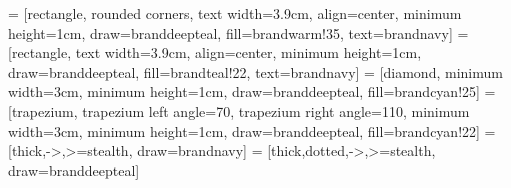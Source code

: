 \usepackage[english]{babel}
\usepackage{libertinus}
\usepackage[scaled=0.86]{beramono}
\usepackage{float}%
\usepackage{hyperref}
\usepackage{tikz}
\usepackage{xcolor}
 = [rectangle, rounded corners, text width=3.9cm, align=center, minimum height=1cm, draw=branddeepteal, fill=brandwarm!35, text=brandnavy]
 = [rectangle, text width=3.9cm, align=center, minimum height=1cm, draw=branddeepteal, fill=brandteal!22, text=brandnavy]
 = [diamond, minimum width=3cm, minimum height=1cm, draw=branddeepteal, fill=brandcyan!25]
 = [trapezium, trapezium left angle=70, trapezium right angle=110, minimum width=3cm, minimum height=1cm, draw=branddeepteal, fill=brandcyan!22]
 = [thick,->,>=stealth, draw=brandnavy]
 = [thick,dotted,->,>=stealth, draw=branddeepteal]
\usetikzlibrary{automata, positioning, arrows}
\usepackage{xurl}%
\usepackage[nohyperlinks]{acronym}%
\usepackage{graphicx}
\usepackage{listings}
\usepackage{microtype}
\usepackage{placeins}
\usepackage[toc=false]{glossaries-extra}%
\usepackage[most]{tcolorbox}
\usepackage{scrlayer-scrpage}
\usepackage{enumitem}
\usepackage{booktabs}
\usepackage{tabularx}
\usepackage{colortbl}


\newcommand{\brandrule}{%
  {\color{brandteal}\rule{\linewidth}{1.4pt}}\par\vspace{-2.5pt}%
  {\color{brandcyan}\rule{\linewidth}{0.6pt}}\par}


